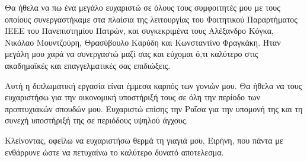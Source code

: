 {Θα ήθελα να πω ένα μεγάλο ευχαριστώ σε όλους τους συμφοιτητές μου με τους οποίους 
συνεργαστήκαμε στα πλαίσια της λειτουργίας του Φοιτητικού Παραρτήματος IEEE του Πανεπιστημίου Πατρών, και συγκεκριμένα τους Αλέξανδρο Κόγκα, Νικόλαο Μουντζούρη, Θρασύβουλο Καρύδη και Κωνσταντίνο Φραγκάκη. Ήταν μεγάλη μου χαρά να συνεργαστώ μαζί σας και εύχομαι ό,τι καλύτερο στις ακαδημαϊκές και επαγγελματικές σας επιδιώξεις.


Αυτή η διπλωματική εργασία είναι έμμεσα καρπός των γονιών μου. Θα ήθελα να τους ευχαριστήσω για την οικονομική υποστήριξή τους σε όλη την περίοδο των προπτυχιακών σπουδών μου. Ευχαριστώ επίσης την Ραΐσα για την υπομονή της και τη συνεχή υποστήριξή της σε περιόδους υψηλού άγχους. 

Κλείνοντας, οφείλω να ευχαριστήσω θερμά τη γιαγιά μου, Ειρήνη, που πάντα με ενθάρρυνε ώστε να πετυχαίνω το καλύτερο δυνατό αποτελεσμα. 



   
}
